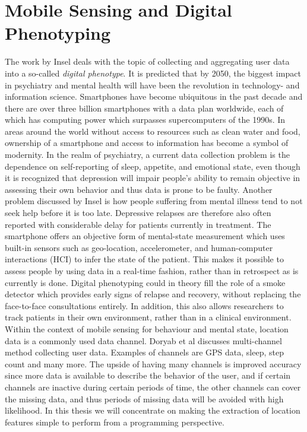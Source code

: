 \section{Mobile Sensing and Digital Phenotyping}
The work by Insel \cite{digital_phenotyping} deals with the topic of collecting and aggregating user data into a so-called \textit{digital phenotype}. It is predicted that by 2050, the biggest impact in psychiatry and mental health will have been the revolution in technology- and information science. Smartphones have become ubiquitous in the past decade and there are over three billion smartphones with a data plan worldwide, each of which has computing power which surpasses supercomputers of the 1990s. In areas around the world without access to resources such as clean water and food, ownership of a smartphone and access to information has become a symbol of modernity. In the realm of psychiatry, a current data collection problem is the dependence on self-reporting of sleep, appetite, and emotional state, even though it is recognized that depression will impair people's ability to remain objective in assessing their own behavior and thus data is prone to be faulty. Another problem discussed by Insel is how people suffering from mental illness tend to not seek help before it is too late. Depressive relapses are therefore also often reported with considerable delay for patients currently in treatment. The smartphone offers an objective form of mental-state measurement which uses built-in sensors such as geo-location, accelerometer, and human-computer interactions (HCI) to infer the state of the patient. This makes it possible to assess people by using data in a real-time fashion, rather than in retrospect as is currently is done. Digital phenotyping could in theory fill the role of a smoke detector which provides early signs of relapse and recovery, without replacing the face-to-face consultations entirely. In addition, this also allows researchers to track patients in their own environment, rather than in a clinical environment. Within the context of mobile sensing for behaviour and mental state, location data is a commonly used data channel. Doryab et al \cite{extraction-of-behavioural-features} discusses multi-channel method collecting user data. Examples of channels are GPS data, sleep, step count and many more. The upside of having many channels is improved accuracy since more data is available to describe the behavior of the user, and if certain channels are inactive during certain periods of time, the other channels can cover the missing data, and thus periods of missing data will be avoided with high likelihood. In this thesis we will concentrate on making the extraction of location features simple to perform from a programming perspective.
